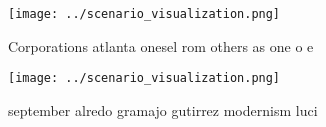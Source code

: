 \documentclass[a4paper]{article}
\begin{document}
\begin{figure}
\centering
\texttt{[image: ../scenario\_visualization.png]}
\caption{Corporations atlanta onesel rom others as one o e
}
\end{figure}
 
\begin{figure}
\centering
\texttt{[image: ../scenario\_visualization.png]}
\caption{ september alredo gramajo gutirrez modernism luci
}
\end{figure}
 
\end{document}
